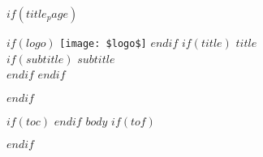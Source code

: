 \documentclass[a4paper,11pt]{article}
\makeatletter
\def\maxwidth{\ifdim\Gin@nat@width>1\linewidth
1\linewidth
\else\Gin@nat@width\fi}
\let\oldincludegraphics\includegraphics %
\renewcommand\includegraphics[2][]{%
  \vspace{8mm}
  \centerline{
  \oldincludegraphics[width=\maxwidth]{#2}
  }
}
\let\zz\[\let\zzz\] %
\let\[\zz\let\]\zzz
\makeatother
\begin{document}
\sloppy %

$if(title_page)$
    \begin{titlepage}
        $if(logo)$
            \texttt{[image: \$logo\$]}
        $endif$
        \vspace*{\fill}
        \vspace{-5cm}
        $if(title)$
            \textsc{\fontsize{28}{30}\headingfont\RaggedRight\nohyphens{$title$}}\\[0.5cm]
            $if(subtitle)$
                \fontsize{22}{30}\headingfontlight\RaggedRight\nohyphens{$subtitle$}\\
            $endif$
        $endif$
        \vfill
        \thispagestyle{titlefooter}
    \end{titlepage}
$endif$

$if(toc)$
  \tableofcontents
  \newpage
$endif$
$body$
$if(tof)$
  \newpage
  \listoffigures
$endif$
\end{document}
